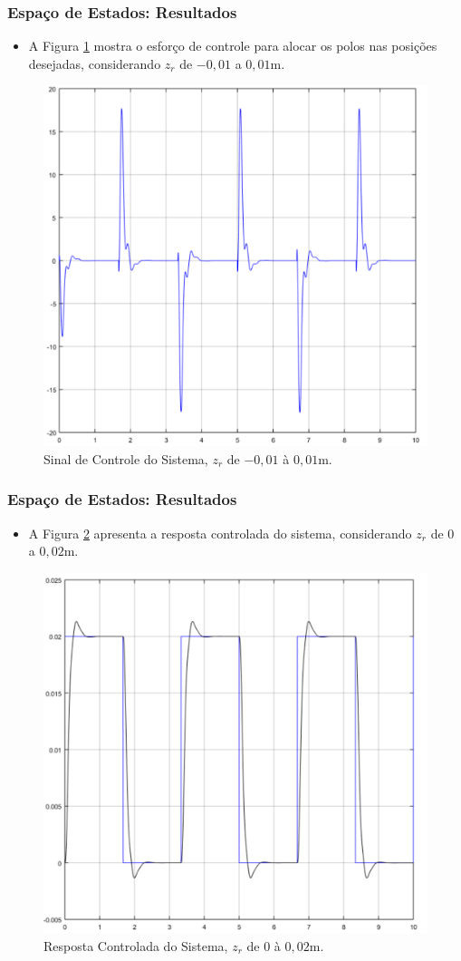 \documentclass{beamer}
\begin{document}
\begin{frame}
\frametitle{Espaço de Estados: Resultados}
\begin{itemize}
\item A Figura \ref{sinalcontroleEE} mostra o esforço de controle para alocar os polos nas posições desejadas, considerando $z_r$ de $-0,01$ a $0,01$m.
\end{itemize}
\begin{figure}[H]
	\centering
\includegraphics[width=.45\columnwidth]{./imagens/sinal_controle_sistema.pdf}
    \renewcommand{\figurename}{Fig. 16}
    \caption{Sinal de Controle do Sistema, $z_r$ de $-0,01$ à $0,01$m.}
	\label{sinalcontroleEE}
\end{figure}
\end{frame}

\begin{frame}
\frametitle{Espaço de Estados: Resultados}
\begin{itemize}
\item A Figura \ref{malhafechadaEE2} apresenta a resposta controlada do sistema, considerando $z_r$ de $0$ a $0,02$m.
\end{itemize}
\begin{figure}[H]
	\centering
\includegraphics[width=.45\columnwidth]{./imagens/resposta_controlada_sistema2.pdf}
    \renewcommand{\figurename}{Fig. 17}
    \caption{Resposta Controlada do Sistema, $z_r$ de $0$ à $0,02$m.}
	\label{malhafechadaEE2}
\end{figure}
\end{frame}
\end{document}
